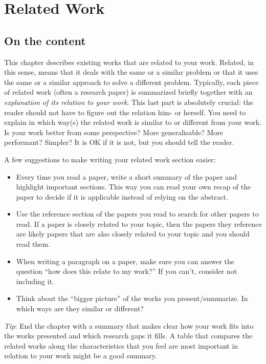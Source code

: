 \documentclass[a4paper,twoside]{bth}
\begin{document}
\chapter{Related Work}
\label{chp:relatedwork}
\section{On the content}
This chapter describes existing works that are related to your work. Related, in this sense, means that it deals with the same or a similar problem or that it uses the same or a similar approach to solve a different problem. Typically, each piece of related work (often a research paper) is summarized briefly together with an \emph{explanation of its relation to your work}. This last part is absolutely crucial: the reader should not have to figure out the relation him- or herself. You need to explain in which way(s) the related work is similar to or different from your work. Is your work better from some perspective? More generalisable? More performant? Simpler? It is OK if it is not, but you should tell the reader.

A few suggestions to make writing your related work section easier:
\begin{itemize}
    \item Every time you read a paper, write a short summary of the paper and highlight important sections. This way you can read your own recap of the paper to decide if it is applicable instead of relying on the abstract.
    \item Use the reference section of the papers you read to search for other papers to read. If a paper is closely related to your topic, then the papers they reference are likely papers that are also closely related to your topic and you should read them.
    \item When writing a paragraph on a paper, make sure you can answer the question ``how does this relate to my work?'' If you can't, consider not including it. 
    \item Think about the ``bigger picture'' of the works you present/summarize. In which ways are they similar or different? 
\end{itemize}
    
\emph{Tip}: End the chapter with a summary that makes clear how your work fits into the works presented and which research gaps it fills. A table that compares the related works along the characteristics that you feel are most important in relation to your work might be a good summary.
    
\end{document}
